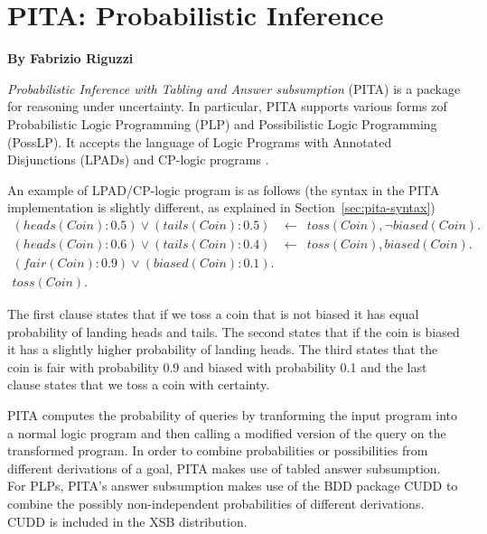 \chapter{ PITA: Probabilistic  Inference}
\label{package:pita} 

  \begin{center}
    {\Large {\bf By Fabrizio Riguzzi}}
  \end{center}


%



{\em Probabilistic Inference with Tabling and Answer subsumption}
(PITA) \cite{RigS13,RigS11a} is a package for reasoning under
uncertainty. In particular, PITA supports various forms zof
Probabilistic Logic Programming (PLP) and Possibilistic Logic
Programming (PossLP). It accepts the language of Logic Programs with
Annotated Disjunctions (LPADs)\cite{VenVer03-TR,VenVer04-ICLP04-IC}
and CP-logic programs
\cite{VenDenBru-JELIA06,DBLP:journals/tplp/VennekensDB09}.

An example of LPAD/CP-logic program is as follows (the syntax in the
PITA implementation is slightly different, as explained in
Section~\ref{sec:pita-syntax})
\begin{eqnarray*}
(heads(Coin):0.5)\vee (tails(Coin):0.5)&\leftarrow&
toss(Coin),\neg biased(Coin).\\
(heads(Coin):0.6)\vee (tails(Coin):0.4)&\leftarrow&
toss(Coin), biased(Coin).\\
(fair(Coin):0.9) \vee (biased(Coin):0.1).&&\\
toss(Coin).&&
\end{eqnarray*}

The first clause states that if we toss a coin that is not biased it
has equal probability of landing heads and tails. The second states
that if the coin is biased it has a slightly higher probability of
landing heads. The third states that the coin is fair with probability
0.9 and biased with probability 0.1 and the last clause states that we
toss a coin with certainty.

PITA computes the probability of queries by tranforming the input
program into a normal logic program and then calling a modified
version of the query on the transformed program.  In order to combine
probabilities or possibilities from different derivations of a goal,
PITA makes use of tabled answer subsumption.  For PLPs, PITA's answer
subsumption makes use of the BDD package CUDD to combine the possibly
non-independent probabilities of different derivations.  CUDD is
included in the XSB distribution.

